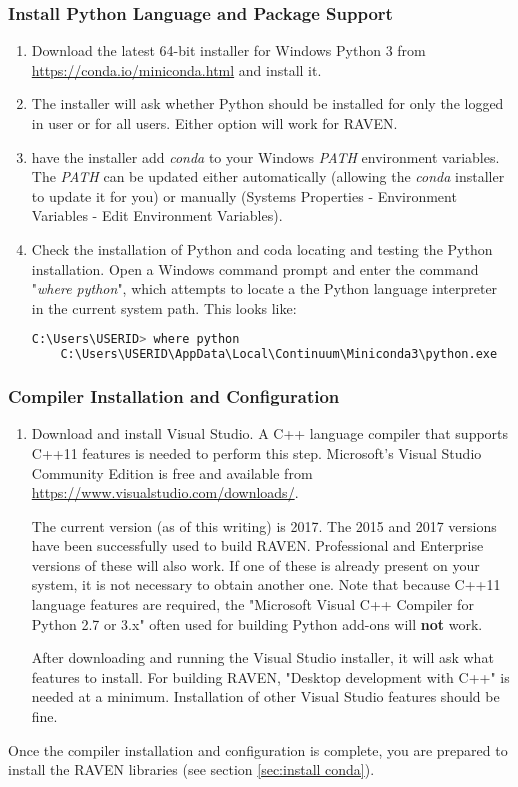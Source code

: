 \subsubsection{Install Python Language and Package Support}
\begin{enumerate}
	\item Download the latest 64-bit installer for Windows Python 3 from
		\url{https://conda.io/miniconda.html} and install it.  \item The installer
		will ask whether Python should be installed for only the logged in user or
		for all users.  Either option will work for RAVEN.
	\item 	have  the installer add \textit{conda} to your Windows \textit{PATH} environment variables.   
	The \textit{PATH} can be updated either automatically (allowing the  \textit{conda} installer to update it for you) 
	or manually (Systems Properties - Environment Variables - Edit Environment Variables).
	\item Check the installation of Python and coda locating and testing the Python installation.   
	Open a Windows command prompt and enter the
		command "{\it where python}", which attempts to locate a the Python language interpreter
		in the current system path.  This looks like:

    \begin{lstlisting}[language=bash, basicstyle=\small]
    C:\Users\USERID> where python
    C:\Users\USERID\AppData\Local\Continuum\Miniconda3\python.exe
    \end{lstlisting}

\end{enumerate}


\subsubsection{Compiler Installation and Configuration}
\begin{enumerate}
	\item Download and install Visual Studio.  A C++ language compiler that supports C++11 features
		is needed to perform this step. Microsoft's Visual Studio Community Edition is free and
		available from \url{https://www.visualstudio.com/downloads/}.

		The current version (as of this writing) is 2017. The 2015 and 2017 versions have been
		successfully used to build RAVEN. Professional and Enterprise versions of these will
		also work. If one of these is already present on your system, it is not necessary to
		obtain another one. Note that because C++11 language features are required, the
		"Microsoft Visual C++ Compiler for Python 2.7 or 3.x" often used for building Python
		add-ons will {\bf not} work.

		After downloading and running the Visual Studio installer, it will ask what features
		to install. For building RAVEN, "Desktop development with C++" is needed at a minimum.
		Installation of other Visual Studio features should be fine.
\end{enumerate}

Once the compiler installation and configuration is complete, you are prepared to install the RAVEN libraries
(see section \ref{sec:install conda}).


